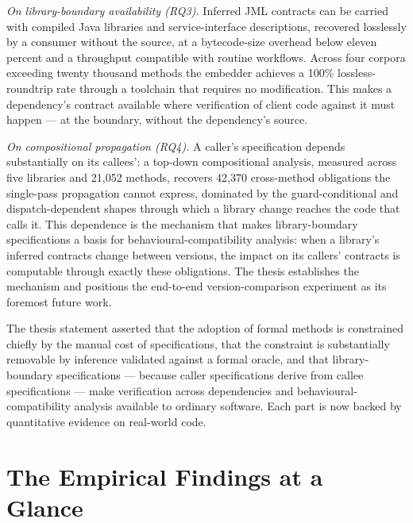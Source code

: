 \emph{On library-boundary availability (RQ3).} Inferred JML contracts can be
carried with compiled Java libraries and service-interface descriptions, recovered
losslessly by a consumer without the source, at a bytecode-size overhead below
eleven percent and a throughput compatible with routine workflows. Across four
corpora exceeding twenty thousand methods the embedder achieves a 100\%
lossless-roundtrip rate through a toolchain that requires no modification. This
makes a dependency's contract available where verification of client code against
it must happen --- at the boundary, without the dependency's source.

\emph{On compositional propagation (RQ4).} A caller's specification depends
substantially on its callees': a top-down compositional analysis, measured across
five libraries and 21{,}052 methods, recovers 42{,}370 cross-method obligations the
single-pass propagation cannot express, dominated by the guard-conditional and
dispatch-dependent shapes through which a library change reaches the code that
calls it. This dependence is the mechanism that makes library-boundary
specifications a basis for behavioural-compatibility analysis: when a library's
inferred contracts change between versions, the impact on its callers' contracts is
computable through exactly these obligations. The thesis establishes the mechanism
and positions the end-to-end version-comparison experiment as its foremost future
work.

The thesis statement asserted that the adoption of formal methods is constrained
chiefly by the manual cost of specifications, that the constraint is substantially
removable by inference validated against a formal oracle, and that library-boundary
specifications --- because caller specifications derive from callee specifications
--- make verification across dependencies and behavioural-compatibility analysis
available to ordinary software. Each part is now backed by quantitative evidence on
real-world code.

\section{The Empirical Findings at a Glance}

